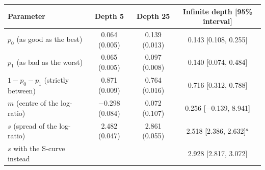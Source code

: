 \begin{tabular}{lccc}
\toprule
Parameter & Depth 5 & Depth 25 & Infinite depth [95\% interval] \\
\midrule
$p_0$ (as good as the best) & 0.064 (0.005) & 0.139 (0.013) & 0.143 [0.108, 0.255] \\
$p_1$ (as bad as the worst) & 0.065 (0.005) & 0.097 (0.008) & 0.140 [0.074, 0.484] \\
$1-p_0-p_1$ (strictly between) & 0.871 (0.009) & 0.764 (0.016) & 0.716 [0.312, 0.788] \\
$m$ (centre of the log-ratio) & $-$0.298 (0.084) & 0.072 (0.107) & 0.256 [$-$0.139, 8.941] \\
$s$ (spread of the log-ratio) & 2.482 (0.047) & 2.861 (0.055) & 2.518 [2.386, 2.632]$^{a}$ \\
\quad $s$ with the S-curve instead & & & 2.928 [2.817, 3.072] \\
\bottomrule
\end{tabular}
